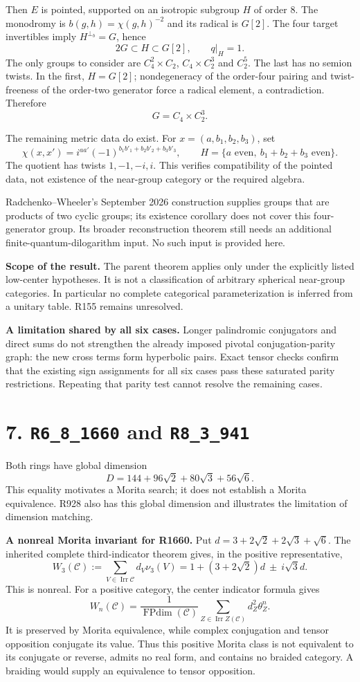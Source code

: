 \documentclass[11pt,a4paper]{article}
\newcommand{\FP}{\operatorname{FPdim}}
\newcommand{\R}[1]{\texttt{#1}}
\newcommand{\Irr}{\operatorname{Irr}}
\begin{document}
Then $E$ is pointed, supported on an isotropic subgroup $H$ of order $8$. The monodromy is $b(g,h)=\chi(g,h)^{-2}$ and its radical is $G[2]$. The four target invertibles imply $H^{\perp_b}=G$, hence
\[
2G\subset H\subset G[2],\qquad q|_H=1.
\]
The only groups to consider are $C_4^2\times C_2$, $C_4\times C_2^3$ and $C_2^5$. The last has no semion twists. In the first, $H=G[2]$; nondegeneracy of the order-four pairing and twist-freeness of the order-two generator force a radical element, a contradiction. Therefore
\[
\boxed{G=C_4\times C_2^3.}
\]

The remaining metric data do exist. For $x=(a,b_1,b_2,b_3)$, set
\[
\chi(x,x')=i^{aa'}(-1)^{b_1b'_1+b_2b'_2+b_3b'_3},\qquad
H=\{a\text{ even},\ b_1+b_2+b_3\text{ even}\}.
\]
The quotient has twists $1,-1,-i,i$. This verifies compatibility of the pointed data, not existence of the near-group category or the required algebra.

Radchenko--Wheeler's September 2026 construction supplies groups that are products of two cyclic groups; its existence corollary does not cover this four-generator group. Its broader reconstruction theorem still needs an additional finite-quantum-dilogarithm input. No such input is provided here.

\textbf{Scope of the result.} The parent theorem applies only under the explicitly listed low-center hypotheses. It is not a classification of arbitrary spherical near-group categories. In particular no complete categorical parameterization is inferred from a unitary table. R155 remains unresolved.

\textbf{A limitation shared by all six cases.} Longer palindromic conjugators and direct sums do not strengthen the already imposed pivotal conjugation-parity graph: the new cross terms form hyperbolic pairs. Exact tensor checks confirm that the existing sign assignments for all six cases pass these saturated parity restrictions. Repeating that parity test cannot resolve the remaining cases.

\newpage
\section*{7. \R{R6\_8\_1660} and \R{R8\_3\_941}}
Both rings have global dimension
\[
D=144+96\sqrt2+80\sqrt3+56\sqrt6.
\]
This equality motivates a Morita search; it does not establish a Morita equivalence. R928 also has this global dimension and illustrates the limitation of dimension matching.

\textbf{A nonreal Morita invariant for R1660.} Put $d=3+2\sqrt2+2\sqrt3+\sqrt6$. The inherited complete third-indicator theorem gives, in the positive representative,
\[
W_3(\mathcal C):=\sum_{V\in\Irr\mathcal C}d_V\nu_3(V)
=1+(3+2\sqrt2)d\ \mathbin{\pm}\ i\sqrt3d.
\]
This is nonreal. For a positive category, the center indicator formula gives
\[
W_n(\mathcal C)=\frac1{\FP(\mathcal C)}
\sum_{Z\in\Irr Z(\mathcal C)}d_Z^2\theta_Z^n.
\]
It is preserved by Morita equivalence, while complex conjugation and tensor opposition conjugate its value. Thus this positive Morita class is not equivalent to its conjugate or reverse, admits no real form, and contains no braided category. A braiding would supply an equivalence to tensor opposition.
\end{document}
